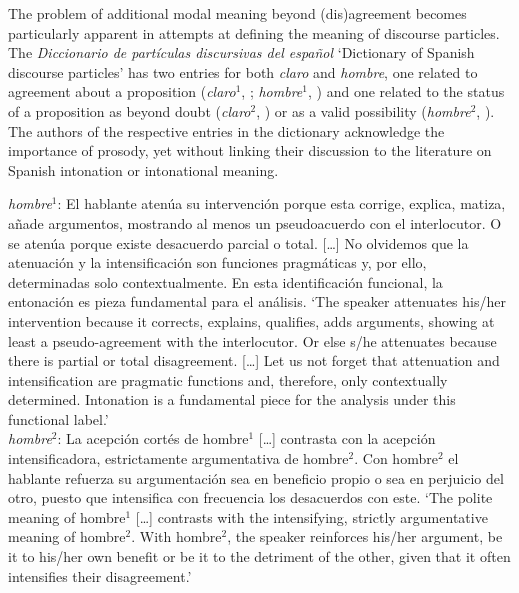 The problem of additional modal meaning beyond (dis)agreement becomes particularly apparent in attempts at defining the meaning of discourse particles. The \textit{Diccionario de partículas discursivas del español} `Dictionary of Spanish discourse particles' has two entries for both \textit{claro} and \textit{hombre}, one related to agreement about a proposition (\textit{claro}$^1$, \cite{PonsBorderia.2011}; \textit{hombre}$^1$, \cite{BrizVillalba.2011}) and one related to the status of a proposition as beyond doubt (\textit{claro}$^2$, \cite{PonsBorderia.2011claro2}) or as a valid possibility (\textit{hombre}$^2$, \cite{BrizVillalba.2011hombre2}). The authors of the respective entries in the dictionary acknowledge the importance of prosody, yet without linking their discussion to the literature on Spanish intonation or intonational meaning.\largerpage

\begin{displayquote}
	\textit{hombre}$^1$: El hablante atenúa su intervención porque esta corrige, explica, matiza, añade argumentos, mostrando al menos un pseudoacuerdo con el interlocutor. O se atenúa porque existe desacuerdo parcial o total. [\ldots] No olvidemos que la atenuación y la intensificación son funciones pragmáticas y, por ello, determinadas solo contextualmente. En esta identificación funcional, la entonación es pieza fundamental para el análisis. \citep[31--32]{Briz.2012}
	\glt `The speaker attenuates his/her intervention because it corrects, explains, qualifies, adds arguments, showing at least a pseudo-agreement with the interlocutor. Or else s/he attenuates because there is partial or total disagreement. [\ldots] Let us not forget that attenuation and intensification are pragmatic functions and, therefore, only contextually determined. Intonation is a fundamental piece for the analysis under this functional label.'\medskip\\	
	\textit{hombre}$^2$: La acepción cortés de hombre$^1$ [\ldots] contrasta con la acepción intensificadora, estrictamente argumentativa de hombre$^2$. Con hombre$^2$ el hablante refuerza su argumentación sea en beneficio propio o sea en perjuicio del otro, puesto que intensifica con frecuencia los desacuerdos con este. \citep[36]{Briz.2012}
	\glt `The polite meaning of hombre$^1$ [\ldots] contrasts with the intensifying, strictly argumentative meaning of hombre$^2$. With hombre$^2$, the speaker reinforces his/her argument, be it to his/her own benefit or be it to the detriment of the other, given that it often intensifies their disagreement.'	
\end{displayquote}


